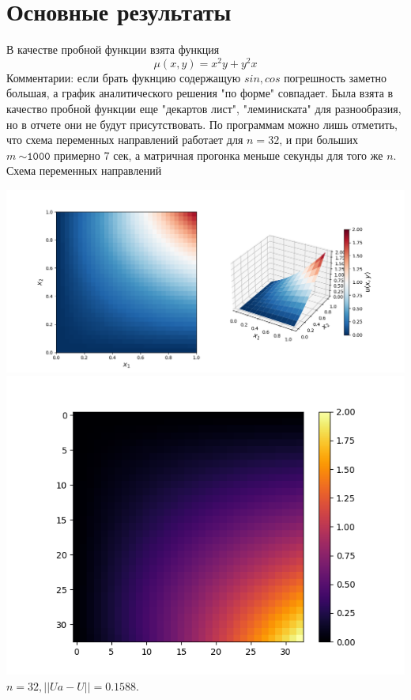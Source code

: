 \documentclass[a4paper, 12pt]{article}
\begin{document}
	\section{Основные результаты}
	В качестве пробной функции взята функция
	$$\mu(x, y) = x^2 y + y^2 x$$ 
	Комментарии: если брать фукнцию содержащую $sin, cos$ погрешность заметно большая, а график аналитического решения "по форме" совпадает. Была взята в качество пробной функции еще "декартов лист", "леминиската" для разнообразия, но в отчете они не будут присутствовать. По программам можно лишь отметить, что схема переменных направлений работает для $n=32$, и при больших $m~\mathtt{\sim1000}$ примерно 7 сек, а матричная прогонка меньше секунды для того же $n$.
	\newpage
	Схема переменных направлений
	\begin{center}
		\includegraphics[scale=0.5]{plot1_1.png} \\
		\includegraphics[scale=0.6]{plot1_2.png} \\
		 $n = 32, ||Ua - U|| = 0.1588$.
	\end{center}
\end{document}

